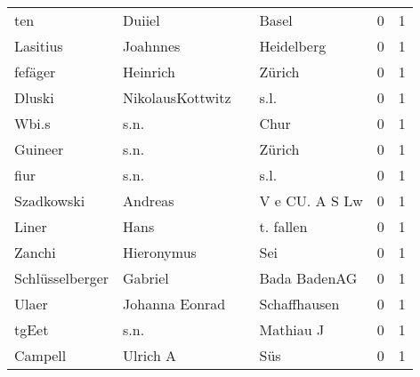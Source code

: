 \begin{tabular}{llllrr}
                      ten &                             Duiiel &             &                                       Basel &          0 &         1 \\
                 Lasitius &                           Joahnnes &             &                                  Heidelberg &          0 &         1 \\
                  fefäger &                           Heinrich &             &                                      Zürich &          0 &         1 \\
                   Dluski &                   NikolausKottwitz &             &                                        s.l. &          0 &         1 \\
                    Wbi.s &                               s.n. &             &                                        Chur &          0 &         1 \\
                  Guineer &                               s.n. &             &                                      Zürich &          0 &         1 \\
                     fiur &                               s.n. &             &                                        s.l. &          0 &         1 \\
               Szadkowski &                            Andreas &             &                              V e CU. A S Lw &          0 &         1 \\
                    Liner &                               Hans &             &                                   t. fallen &          0 &         1 \\
                   Zanchi &                         Hieronymus &             &                                         Sei &          0 &         1 \\
          Schlüsselberger &                            Gabriel &             &                                Bada BadenAG &          0 &         1 \\
                    Ulaer &                     Johanna Eonrad &             &                                Schaffhausen &          0 &         1 \\
                    tgEet &                               s.n. &             &                                   Mathiau J &          0 &         1 \\
                  Campell &                           Ulrich A &             &                                         Süs &          0 &         1 \\

\end{tabular}
